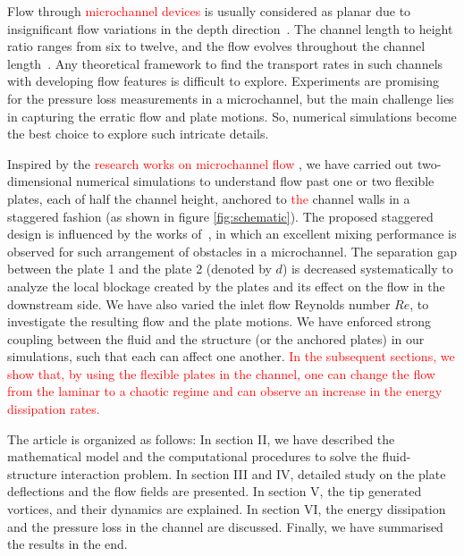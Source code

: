 \documentclass[aps,pre,twocolumn,aps,longbibliography]{revtex4-1}
\begin{document}
	Flow through \textcolor{red}{microchannel devices} is usually considered as planar due to insignificant flow variations in the depth direction~\cite{Khatvakar2007, LambertRangel2010, Stone2001}. The channel length to height ratio ranges from six to twelve, and the flow evolves throughout the channel length~\cite{Beebe2010, Whitesides2006, Liu2010}. Any theoretical framework to find the transport rates in such channels with developing flow features is difficult to explore. Experiments are promising for the pressure loss measurements in a microchannel, but the main challenge lies in capturing the erratic flow and plate motions. So, numerical simulations become the best choice to explore such intricate details.
	
	Inspired by the \textcolor{red}{research works on microchannel flow} \cite{Khatvakar2007, LambertRangel2010, Gleeson2005, Pathak2012, Kim2010, Stone2001, Stone2004}, we have carried out two-dimensional numerical simulations to understand flow past one or two flexible plates, each of half the channel height, anchored to \textcolor{red}{the} channel walls in a staggered fashion (as shown in figure \ref{fig:schematic}). The proposed staggered design is influenced by the works of~\cite{Asgar2007}, in which an excellent mixing performance is observed for such arrangement of obstacles in a microchannel. The separation gap between the plate 1 and the plate 2 (denoted by $d$) is decreased systematically to analyze the local blockage created by the plates and its effect on the flow in the downstream side. We have also varied the inlet flow Reynolds number $Re$, to investigate the resulting flow and the plate motions. We have enforced strong coupling between the fluid and the structure (or the anchored plates) in our simulations, such that each can affect one another. \textcolor{red}{In the subsequent sections, we show that, by using the flexible plates in the channel, one can change the flow from the laminar to a chaotic regime and can observe an increase in the energy dissipation rates.}
	
	
	
	The article is organized as follows: In section II, we have described the mathematical model and the computational procedures to solve the fluid-structure interaction problem. In section III and IV, detailed study on the plate deflections and the flow fields are presented. In section V, the tip generated vortices, and their dynamics are explained. In section VI, the energy dissipation and the pressure loss in the channel are discussed. Finally, we have summarised the results in the end.
	
\end{document}
